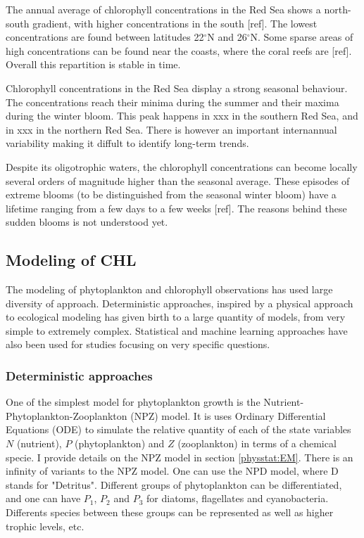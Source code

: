 			The annual average of chlorophyll concentrations in the Red Sea shows a north-south gradient, with higher concentrations in the south [ref]. The lowest concentrations are found between latitudes 22$^\circ$N and 26$^\circ$N. Some sparse areas of high concentrations can be found near the coasts, where the coral reefs are [ref]. Overall this repartition is stable in time. 

			Chlorophyll concentrations in the Red Sea display a strong seasonal behaviour. The concentrations reach their minima during the summer and their maxima during the winter bloom. This peak happens in xxx in the southern Red Sea, and in xxx in the northern Red Sea. There is however an important internannual variability making it diffult to identify long-term trends. 

			Despite its oligotrophic waters, the chlorophyll concentrations can become locally several orders of magnitude higher than the seasonal average. These episodes of extreme blooms (to be distinguished from the seasonal winter bloom) have a lifetime ranging from a few days to a few weeks [ref]. The reasons behind these sudden blooms is not understood yet. 

	\subsection{Modeling of CHL}
	\label{intro:context:modeling}

		The modeling of phytoplankton and chlorophyll observations has used large diversity of approach. Deterministic approaches, inspired by a physical approach to ecological modeling has given birth to a large quantity of models, from very simple to extremely complex. Statistical and machine learning approaches have also been used for studies focusing on very specific questions. 

		\subsubsection{Deterministic approaches}

			One of the simplest model for phytoplankton growth is the Nutrient-Phytoplankton-Zooplankton (NPZ) model. It is uses Ordinary Differential Equations (ODE) to simulate the relative quantity of each of the state variables $N$ (nutrient), $P$ (phytoplankton) and $Z$ (zooplankton) in terms of a chemical specie. I provide details on the NPZ model in section \ref{physstat:EM}. There is an infinity of variants to the NPZ model. One can use the NPD model, where D stands for "Detritus". Different groups of phytoplankton can be differentiated, and one can have $P_1$, $P_2$ and $P_3$ for diatoms, flagellates and cyanobacteria. Differents species between these groups can be represented as well as higher trophic levels, etc.

